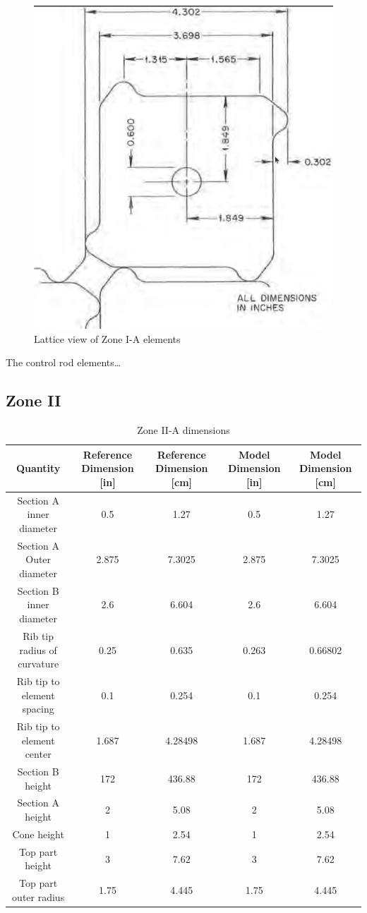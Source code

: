 \begin{figure}[htpb]
    \centering
    \includegraphics[width=0.25\linewidth]{figs/ch4/zone_ia_lattice_ref.png}
    \caption{Lattice view of Zone I-A elements}
    \label{fig:msbr-ia-lattice}
\end{figure}



The control rod elements\ldots


\subsection{Zone II}

\begin{table}[htpb]
    \centering
    \caption{Zone II-A dimensions}
    \label{tab:zone-iia-specs}
    \begin{tabulary}{\linewidth}{|C|CC|CC|}
    \hline
    Quantity & Reference Dimension [in] & Reference Dimension [\unit{\centi\metre}] & Model Dimension [in] & Model Dimension [\unit{\centi\metre}]\\
    \hline
    Section A inner diameter & 0.5 & 1.27 & 0.5 & 1.27 \\
    \hline
    Section A Outer diameter & 2.875 & 7.3025 & 2.875 & 7.3025 \\
    \hline
    Section B inner diameter & 2.6 & 6.604 & 2.6 & 6.604 \\
    \hline
    Rib tip radius of curvature & 0.25 & 0.635 & 0.263 & 0.66802\\
    \hline
    Rib tip to element spacing & 0.1 & 0.254 & 0.1 & 0.254\\
    \hline
    Rib tip to element center & 1.687 & 4.28498 & 1.687 & 4.28498\\
    \hline
    Section B height & 172 & 436.88 & 172 & 436.88\\
    \hline
    Section A height & 2 & 5.08 & 2 & 5.08 \\
    \hline
    Cone height & 1 & 2.54 & 1 & 2.54 \\
    \hline
    Top part height & 3 & 7.62 & 3 & 7.62 \\
    \hline
    Top part outer radius & 1.75 & 4.445 & 1.75 & 4.445 \\
    \hline
    \end{tabulary}
\end{table}

